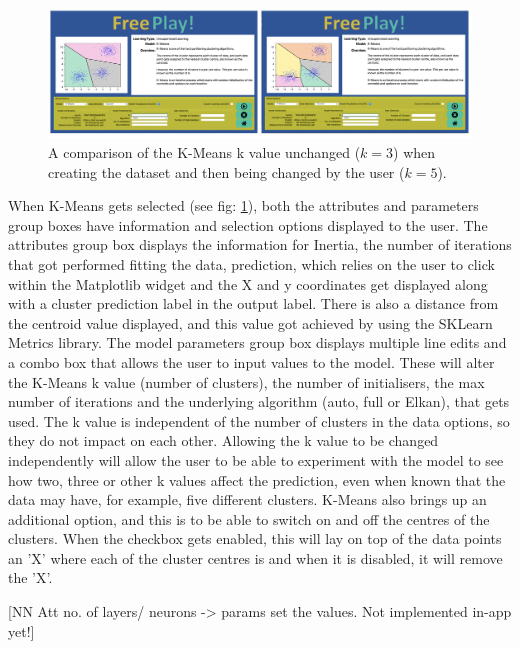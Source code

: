 		\begin{figure}[t]
			\includegraphics[width=15cm]{graphics/chaning_k_fp_example.png}
			\caption{A comparison of the K-Means k value unchanged ($k=3$) when creating the dataset and then being changed by the user ($k=5$).}
			\label{fig:km_example}
		\end{figure}
		
		When K-Means gets selected (see fig: \ref{fig:km_example}), both the attributes and parameters group boxes have information and selection options displayed to the user. The attributes group box displays the information for Inertia, the number of iterations that got performed fitting the data, prediction, which relies on the user to click within the Matplotlib widget and the X and y coordinates get displayed along with a cluster prediction label in the output label. There is also a distance from the centroid value displayed, and this value got achieved by using the SKLearn Metrics library. The model parameters group box displays multiple line edits and a combo box that allows the user to input values to the model. These will alter the K-Means k value (number of clusters), the number of initialisers, the max number of iterations and the underlying algorithm (auto, full or Elkan), that gets used.  The k value is independent of the number of clusters in the data options, so they do not impact on each other. Allowing the k value to be changed independently will allow the user to be able to experiment with the model to see how two, three or other k values affect the prediction, even when known that the data may have, for example, five different clusters. K-Means also brings up an additional option, and this is to be able to switch on and off the centres of the clusters. When the checkbox gets enabled, this will lay on top of the data points an 'X' where each of the cluster centres is and when it is disabled, it will remove the 'X'.
		
	
		[NN Att no. of layers/ neurons -> params set the values. Not implemented in-app yet!]
		
